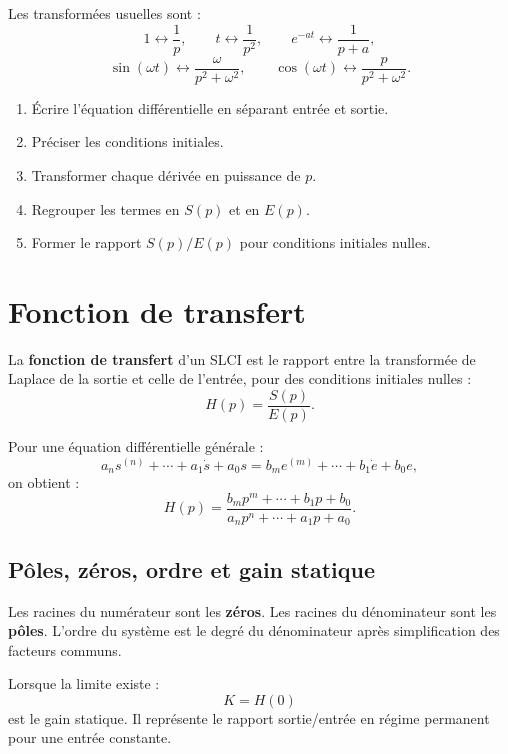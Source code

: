Les transformées usuelles sont :
\[
1\longleftrightarrow \frac1p,\qquad
t\longleftrightarrow \frac1{p^2},\qquad
e^{-at}\longleftrightarrow \frac1{p+a},
\]
\[
\sin(\omega t)\longleftrightarrow \frac{\omega}{p^2+\omega^2},\qquad
\cos(\omega t)\longleftrightarrow \frac{p}{p^2+\omega^2}.
\]

\begin{SAmethode}[title={Passage d'une équation différentielle à Laplace}]
\begin{enumerate}
  \item Écrire l'équation différentielle en séparant entrée et sortie.
  \item Préciser les conditions initiales.
  \item Transformer chaque dérivée en puissance de $p$.
  \item Regrouper les termes en $S(p)$ et en $E(p)$.
  \item Former le rapport $S(p)/E(p)$ pour conditions initiales nulles.
\end{enumerate}
\end{SAmethode}

\section{Fonction de transfert}\label{sec:sa-fonction-transfert}

\begin{SAdefinition}
La \textbf{fonction de transfert} d'un SLCI est le rapport entre la transformée de Laplace de la sortie et celle de l'entrée, pour des conditions initiales nulles :
\[
H(p)=\frac{S(p)}{E(p)}.
\]
\end{SAdefinition}

Pour une équation différentielle générale :
\[
a_n s^{(n)}+\cdots+a_1\dot{s}+a_0s
=b_m e^{(m)}+\cdots+b_1\dot{e}+b_0e,
\]
on obtient :
\[
H(p)=\frac{b_mp^m+\cdots+b_1p+b_0}{a_np^n+\cdots+a_1p+a_0}.
\]

\subsection{Pôles, zéros, ordre et gain statique}

Les racines du numérateur sont les \textbf{zéros}. Les racines du dénominateur sont les \textbf{pôles}. L'ordre du système est le degré du dénominateur après simplification des facteurs communs.

Lorsque la limite existe :
\[
K=H(0)
\]
est le gain statique. Il représente le rapport sortie/entrée en régime permanent pour une entrée constante.

